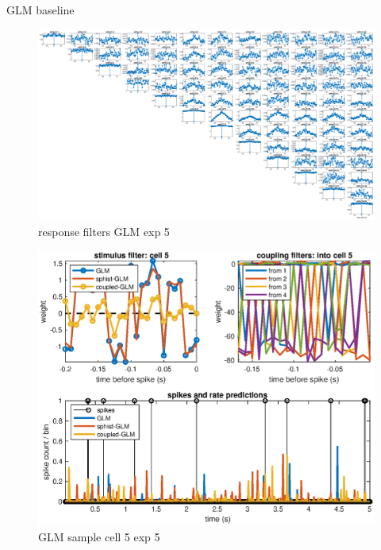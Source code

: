 \documentclass[mphil,deptreport,ianc]{infthesis} %
\begin{document}
GLM baseline

\begin{figure}
    \centering
    \includegraphics[width=\columnwidth]{figures/sleep/plot1_cell5_pdf.eps}
    \caption{response filters GLM exp 5}
\end{figure}

\begin{figure}
    \centering
    \includegraphics[width=0.8\columnwidth]{figures/sleep/GLM_multi_cell5_5sec_bin_white_noise.eps}
    \caption{GLM sample cell 5 exp 5}
\end{figure}




    
\end{document}
